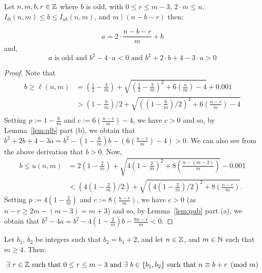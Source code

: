 \begin{lemma}[main]
    \label{lem:main}
    \leanok
    Let $n,m,b,r\in\mathbb{Z}$ where $b$ is odd, with $0 \leq r \leq m - 3$, $2\cdot m \leq n$, $I_{lb}(n,m)\leq b \leq I_{ub}(n,m)$, and $m \mid (n-b-r)$ then:
    
    \[
        a = 2\cdot \frac{n - b - r}{m} + b
        \]
        and,
        \[
            a\text{ is odd and } b^2 - 4\cdot a < 0 \text{ and } b^2 + 2 \cdot b + 4 - 3\cdot a > 0
            \]    
        \end{lemma}
        
\begin{proof}
    \leanok
Note that
\begin{align*}
b \geq \ell(n,m)
& =
  \left(\frac{1}{2}-\frac{3}{m}\right)
  + \sqrt{\left(\frac{1}{2}-\frac{3}{m}\right)^2
  + 6\left(\frac{n}{m}\right) - 4}+0.001 \\ 
& >
  \left(1-\frac{6}{m}\right)/2
  +\sqrt{\left(\left(1-\frac{6}{m}\right)/2\right)^2
  + 6\left(\frac{n-r}{m}\right) - 4} \\
\end{align*}
Setting $p := 1 - \frac{6}{m}$ and $c := 6 \left(\frac{n - r}{m}\right) - 4$,
  we have $c > 0$ and so, by Lemma~\ref{lem:qlb} part (b), we obtain that
$b^2 + 2b + 4 - 3a = b ^ 2 - \left(1 - \frac{6}{m}\right) b -
\left(6\left(\frac{n - r}{m}\right) - 4\right) > 0$.
We can also see from the above derivation that $b > 0$. 
Now, 
\begin{align*}
  b \leq u(n,m) 
  & = 2\left(1-\frac{2}{m}\right)+\sqrt{4\left(1-\frac{2}{m}\right)^2
      + 8\left(\frac{n-(m-3)}{m}\right)} - 0.001 \\
  & < \left(4\left(1-\frac{2}{m}\right)/2\right) 
      + \sqrt{\left(4\left(1-\frac{2}{m}\right)/2\right)^2
      + 8\left(\frac{n-r}{m}\right)}.
\end{align*}
Setting $p := 4 \left(1 - \frac{2}{m}\right)$ and 
$c := 8 \left(\frac{n - r}{m}\right)$,
we have $c > 0$ (as $n - r \geq 2m - (m-3) = m+3$) and so, by 
  Lemma~\ref{lem:qub} part (a),
we obtain that
$b^2 - 4a = b^2 - 4 \left(1 - \frac{2}{m}\right) b - \frac{8n - r}{m} < 0.$

\end{proof}


\begin{theorem}
    \label{thm:mod_m_congr}
    \leanok
    Let $b_1$, $b_2$ be integers such that $b_2 = b_1 + 2$, and let $n\in \mathbb{Z}$, and $m\in \mathbb{N}$ such that $m \geq 4$. Then:
    
    \[
        \exists\ r \in \mathbb{Z} \text{ such that } 0 \leq r \leq m - 3\text{ and } \exists\ b\in \{b_1, b_2\} \text{ such that } n \equiv b + r \pmod{m}
    \]
\end{theorem}
    

